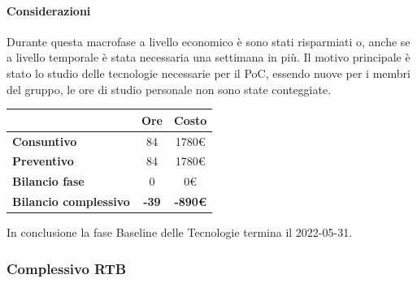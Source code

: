 \paragraph{Considerazioni} \hfill \break
Durante questa macrofase a livello economico è sono stati risparmiati o, anche se a livello temporale è stata necessaria una settimana in più.
Il motivo principale è stato lo studio delle tecnologie necessarie per il PoC, essendo nuove per i membri del gruppo, le ore di studio personale non sono state conteggiate. \newline
\begin{center}
	\renewcommand{\arraystretch}{1.8}
	\begin{tabular}{ | l |c|c| }
    \hline
    & \textbf{Ore} & \textbf{Costo} \\
	\hline
    \textbf{Consuntivo} & 84 & 1780\euro \\
    \hline
    \textbf{Preventivo} & 84 & 1780\euro \\
    \hline
    \textbf{Bilancio fase} & 0 & 0\euro \\
    \hline
    \textbf{Bilancio complessivo} & \textbf{-39} & \textbf{-890\euro} \\
    \hline
    \end{tabular}
\end{center}
In conclusione la fase Baseline delle Tecnologie termina il 2022-05-31.


\subsubsection{Complessivo RTB}
